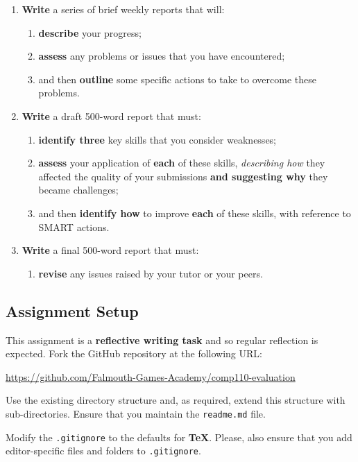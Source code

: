 \documentclass{../fal_assignment}
\begin{document}
\begin{enumerate}[label=(\alph*)]
    \item \textbf{Write} a series of brief weekly reports that will:
    	\begin{enumerate}[label=\roman*.]
    		\item \textbf{describe} your progress;
    		\item \textbf{assess} any problems or issues that you have encountered;
    		\item and then \textbf{outline} some specific actions to take to overcome these problems.
	\end{enumerate}
    \item \textbf{Write} a draft 500-word report that must:
    	\begin{enumerate}[label=\roman*.]
    		\item \textbf{identify three} key skills that you consider weaknesses;
    		\item \textbf{assess} your application of \textbf{each} of these skills, \textit{describing how} they affected the quality of your submissions \textbf{and suggesting why} they became challenges;
    		\item and then \textbf{identify how} to improve \textbf{each} of these skills, with reference to SMART actions.
	\end{enumerate}
    \item \textbf{Write} a final 500-word report that must:
    	\begin{enumerate}[label=\roman*.]
    		\item \textbf{revise} any issues raised by your tutor or your peers.
	\end{enumerate}
\end{enumerate}

\subsection*{Assignment Setup}

This assignment is a \textbf{reflective writing task} and so regular reflection is expected. Fork the GitHub repository at the following URL:

\indent \url{https://github.com/Falmouth-Games-Academy/comp110-evaluation}

Use the existing directory structure and, as required, extend this structure with sub-directories. Ensure that you maintain the \texttt{readme.md} file. 

Modify the \texttt{.gitignore} to the defaults for \textbf{TeX}. Please, also ensure that you add editor-specific files and folders to \texttt{.gitignore}. 
\end{document}
